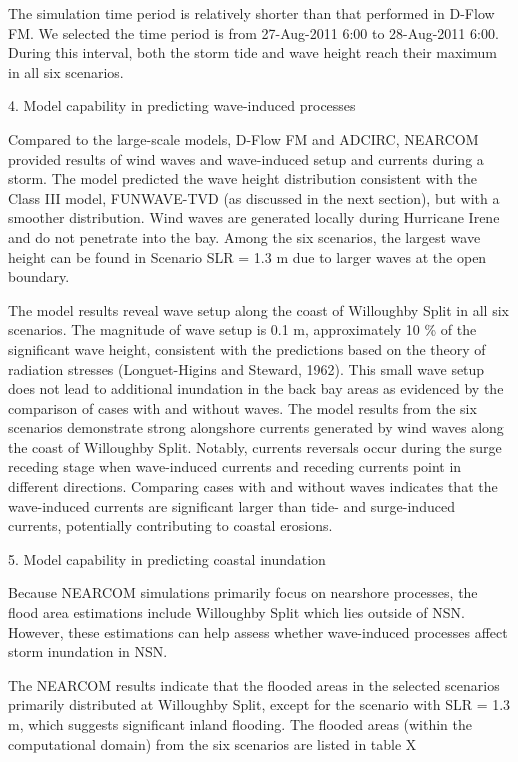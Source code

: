 \documentclass[11pt]{article}
\begin{document}
The simulation time period is relatively shorter than that performed in D-Flow FM.  We selected the time period is from 27-Aug-2011 6:00 to 28-Aug-2011 6:00. During this interval, both the storm tide and wave height reach their maximum in all six scenarios.   

4. Model capability in predicting wave-induced processes

Compared to the large-scale models, D-Flow FM and ADCIRC, NEARCOM provided results of wind waves and wave-induced setup and currents during a storm. The model predicted  the wave height distribution consistent with the Class III model, FUNWAVE-TVD (as discussed in the next section), but with a smoother distribution. Wind waves are generated locally during Hurricane Irene and do not penetrate into the bay. Among the six scenarios, the largest wave height can be found in Scenario SLR = 1.3 m due to larger waves at the open boundary. 
 
 The model results reveal wave setup along the coast of Willoughby Split in all six scenarios. The magnitude of wave setup is 0.1 m, approximately 10 \% of the significant wave height, consistent with the predictions based on the theory of radiation stresses (Longuet-Higins and Steward, 1962). This small wave setup does not lead to additional inundation in the back bay areas as evidenced by the comparison of cases with and without waves. The model results from the six scenarios demonstrate strong alongshore currents generated by wind waves along the coast of Willoughby Split. Notably, currents reversals occur during the surge receding stage when wave-induced currents and receding currents point in different directions.  Comparing cases with and without waves indicates that  the wave-induced currents are significant larger than tide- and surge-induced currents, potentially contributing to coastal erosions. 

5. Model capability in predicting coastal inundation

Because NEARCOM simulations primarily focus on nearshore processes, the flood area estimations include Willoughby Split which lies outside of NSN. However, these estimations can help assess whether wave-induced processes affect storm inundation in NSN. 
 
 The NEARCOM results indicate that the flooded areas in the selected scenarios primarily distributed at Willoughby Split, except for the scenario with SLR = 1.3 m, which suggests significant inland flooding. The flooded areas (within the computational domain) from the six scenarios are listed in table X
 
\end{document}
